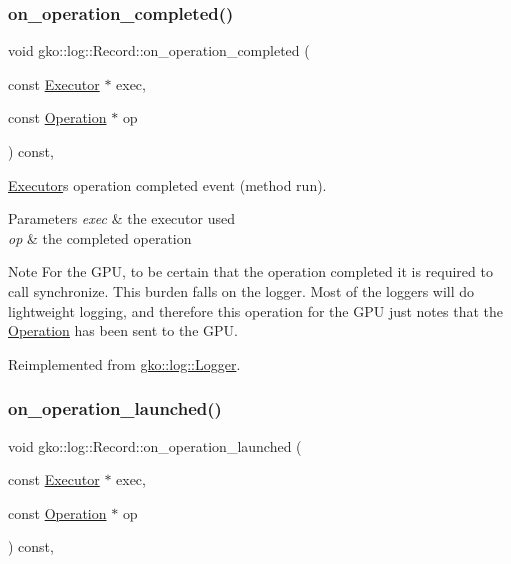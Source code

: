 \subsubsection{\texorpdfstring{on\+\_\+operation\+\_\+completed()}{on\_operation\_completed()}}
{\footnotesize\ttfamily void gko\+::log\+::\+Record\+::on\+\_\+operation\+\_\+completed (\begin{DoxyParamCaption}\item[{const \hyperlink{classgko_1_1Executor}{Executor} $\ast$}]{exec,  }\item[{const \hyperlink{classgko_1_1Operation}{Operation} $\ast$}]{op }\end{DoxyParamCaption}) const\hspace{0.3cm}{\ttfamily [override]}, {\ttfamily [virtual]}}



\hyperlink{classgko_1_1Executor}{Executor}\textquotesingle{}s operation completed event (method run). 


\begin{DoxyParams}{Parameters}
{\em exec} & the executor used \\
\hline
{\em op} & the completed operation\\
\hline
\end{DoxyParams}
\begin{DoxyNote}{Note}
For the G\+PU, to be certain that the operation completed it is required to call synchronize. This burden falls on the logger. Most of the loggers will do lightweight logging, and therefore this operation for the G\+PU just notes that the \hyperlink{classgko_1_1Operation}{Operation} has been sent to the G\+PU. 
\end{DoxyNote}


Reimplemented from \hyperlink{classgko_1_1log_1_1Logger}{gko\+::log\+::\+Logger}.

\mbox{\label{classgko_1_1log_1_1Record_ae6557085190b7d18419e08d4da3de7c7}} 
\subsubsection{\texorpdfstring{on\+\_\+operation\+\_\+launched()}{on\_operation\_launched()}}
{\footnotesize\ttfamily void gko\+::log\+::\+Record\+::on\+\_\+operation\+\_\+launched (\begin{DoxyParamCaption}\item[{const \hyperlink{classgko_1_1Executor}{Executor} $\ast$}]{exec,  }\item[{const \hyperlink{classgko_1_1Operation}{Operation} $\ast$}]{op }\end{DoxyParamCaption}) const\hspace{0.3cm}{\ttfamily [override]}, {\ttfamily [virtual]}}



